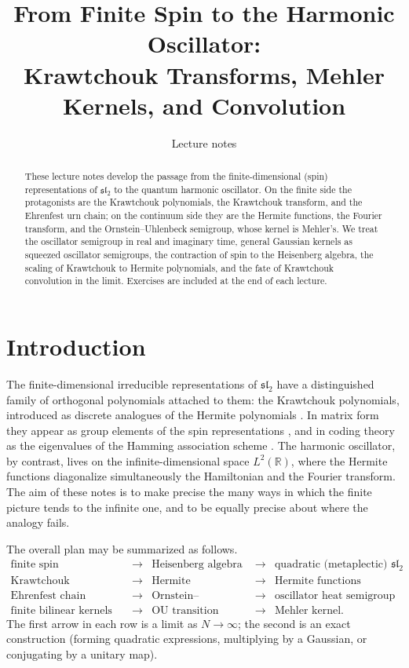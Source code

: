 \documentclass[11pt,reqno]{amsart}
\title[Finite Spin to the Harmonic Oscillator]{From Finite Spin to the Harmonic Oscillator:\\Krawtchouk Transforms, Mehler Kernels, and Convolution}
\date{Lecture notes}
\theoremstyle{definition}
\theoremstyle{remark}
\newcommand{\R}{\mathbb R}
\begin{document}
\begin{abstract}
These lecture notes develop the passage from the finite-dimensional
(spin) representations of $\mathfrak{sl}_2$ to the quantum harmonic
oscillator. On the finite side the protagonists are the Krawtchouk
polynomials, the Krawtchouk transform, and the Ehrenfest urn chain; on
the continuum side they are the Hermite functions, the Fourier transform,
and the Ornstein--Uhlenbeck semigroup, whose kernel is Mehler's. We
treat the oscillator semigroup in real and imaginary time, general
Gaussian kernels as squeezed oscillator semigroups, the contraction of
spin to the Heisenberg algebra, the scaling of Krawtchouk to Hermite
polynomials, and the fate of Krawtchouk convolution in the limit.
Exercises are included at the end of each lecture.
\end{abstract}
\maketitle
\tableofcontents

\section*{Introduction}
The finite-dimensional irreducible representations of $\mathfrak{sl}_2$
have a distinguished family of orthogonal polynomials attached to them:
the Krawtchouk polynomials, introduced as discrete analogues of the
Hermite polynomials \cite{Krawtchouk1929}. In matrix form they appear as
group elements of the spin representations \cite{FeinsilverKocik2005},
and in coding theory as the eigenvalues of the Hamming association scheme
\cite{Delsarte1973,MacWilliamsSloane1977}. The harmonic oscillator, by
contrast, lives on the infinite-dimensional space $L^2(\R)$, where the
Hermite functions diagonalize simultaneously the Hamiltonian and the
Fourier transform. The aim of these notes is to make precise the many
ways in which the finite picture tends to the infinite one, and to be
equally precise about where the analogy fails.

The overall plan may be summarized as follows.
\[
\begin{array}{ccccc}
\text{finite spin}&\longrightarrow&\text{Heisenberg algebra}
 &\longrightarrow&\text{quadratic (metaplectic) $\mathfrak{sl}_2$}\\
\text{Krawtchouk polynomials}&\longrightarrow&\text{Hermite polynomials}
 &\longrightarrow&\text{Hermite functions}\\
\text{Ehrenfest chain}&\longrightarrow&\text{Ornstein--Uhlenbeck}
 &\longrightarrow&\text{oscillator heat semigroup}\\
\text{finite bilinear kernels}&\longrightarrow&\text{OU transition kernel}
 &\longrightarrow&\text{Mehler kernel}.
\end{array}
\]
The first arrow in each row is a limit as $N\to\infty$; the second is
an exact construction (forming quadratic expressions, multiplying by a
Gaussian, or conjugating by a unitary map).
\end{document}
